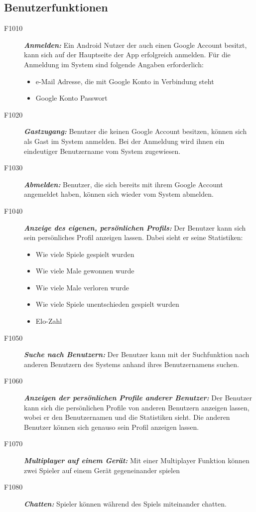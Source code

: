 \documentclass[parskip=full]{scrartcl}
\begin{document}
\subsection{Benutzerfunktionen}
\begin{description}
	\item[F1010] \textbf{\textit{Anmelden: }} Ein \gls{Android} Nutzer der auch einen Google Account besitzt, kann sich auf der Hauptseite der App erfolgreich anmelden. Für die Anmeldung im System sind folgende Angaben erforderlich:
	\begin{itemize}
		\item e-Mail Adresse, die mit Google Konto in Verbindung steht
		\item Google Konto Passwort 
	\end{itemize}  
	\item[F1020] \textbf{\textit{Gastzugang: }} Benutzer die keinen Google Account besitzen, können sich als Gast im System anmelden. Bei der Anmeldung wird ihnen ein eindeutiger Benutzername vom System zugewiesen. 
	\item[F1030] \textbf{\textit{Abmelden: }} Benutzer, die sich bereits mit ihrem Google Account angemeldet haben, können sich wieder vom System abmelden.
	
	\item [F1040] \textbf{\textit{Anzeige des eigenen, persönlichen Profils: }}  Der Benutzer kann sich sein persönliches Profil anzeigen lassen. Dabei sieht er seine Statistiken:

	\begin{itemize}
		\item Wie viele Spiele gespielt wurden
		\item Wie viele Male gewonnen wurde
		\item Wie viele Male verloren wurde
		\item Wie viele Spiele unentschieden gespielt wurden
		\item Elo-Zahl
		
	\end{itemize}
	\item[F1050] \textbf{\textit{Suche nach Benutzern: }} Der Benutzer kann mit der Suchfunktion nach anderen Benutzern des Systems anhand ihres Benutzernamens suchen.
	
	\item[F1060]  \textbf{\textit{Anzeigen der persönlichen Profile anderer Benutzer: }}
	Der Benutzer kann sich die persönlichen Profile von anderen Benutzern anzeigen lassen, wobei er den Benutzernamen und die Statistiken sieht. Die anderen Benutzer können sich genauso sein Profil anzeigen lassen.
	
	\item[F1070] \textbf{\textit{Multiplayer auf einem Gerät: }}  Mit einer Multiplayer Funktion können zwei Spieler auf einem Gerät gegeneinander spielen
	
	\item[F1080] \textbf{\textit{Chatten: }} Spieler können während des Spiels miteinander chatten.	
	
\end{description}
\end{document}
